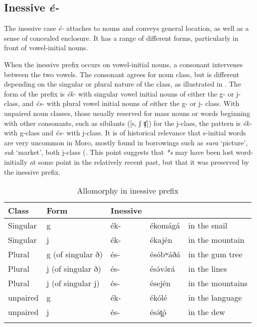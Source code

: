 \subsection{Inessive \textit{é-}}\label{sec:ch6:inessive}

The inessive case \textit{é-} attaches to nouns and conveys general location, as well as a sense of concealed enclosure. It has a range of different forms, particularly in front of vowel-initial nouns. 

When the inessive prefix occurs on vowel-initial nouns, a consonant intervenes between the two vowels. The consonant agrees for noun class, but is different depending on the singular or plural nature of the class, as illustrated in . The form of the prefix is \textit{ék-} with singular vowel initial nouns of either the g- or j- class, and \textit{és-} with plural vowel initial nouns of either the g- or j- class. With unpaired noun classes, those usually reserved for mass nouns or words beginning with other consonants, such as sibilants ([s, ʃ ʧ]) for the j-class, the pattern is \textit{ék-} with g-class and \textit{és-} with j-class. It is of historical relevance that s-initial words are very uncommon in Moro, mostly found in borrowings such as \textit{sura} `picture', \textit{suk} `market', both j-class (. This point suggests that \textit{*s} may have been lost word-initially at some point in the relatively recent past, but that it was preserved by the inessive prefix.

\begin{table}
\caption{Allomorphy in inessive prefix}\label{tab:ch6:iness}
\begin{tabular}[t]{lllll}
\lsptoprule
Class	&	Form &	Inessive	\\
\midrule 
Singular& g	&	ék-			&	ékomágá 		&	in the snail\\
Singular& j	&	ék-			&	ékajén		&	in the mountain\\
Plural	& g (of singular ð)	&	és-			&	ésóbʷáðá&	in the gum tree\\
Plural	& j (of singular ð)	&	és-			&	ésə́və́rá	&	in the lines\\
Plural	& j (of singular j)	&	és-			&	ésején	&	in the mountains\\
unpaired& g	&	ék-			&	ékólé		&	in the language\\
unpaired& j	& 	és-  		&	ésə́t̪ó		&	in the dew\\
\lspbottomrule
\end{tabular}	
\end{table}

